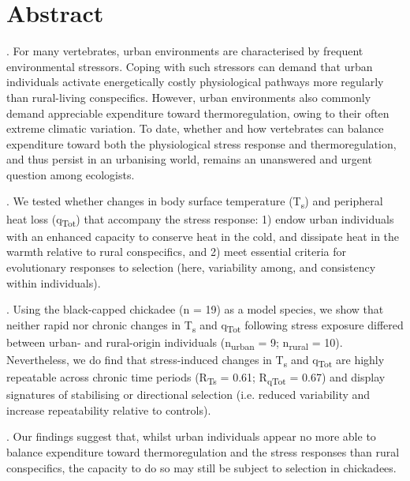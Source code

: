 \documentclass[12pt]{article}
\begin{document}
\linenumbers
\fontsize{12pt}{12pt}\selectfont

\section*{Abstract}

. For many vertebrates, urban environments are characterised by frequent environmental stressors. Coping with such stressors can demand that urban individuals activate energetically costly physiological pathways more regularly than rural-living conspecifics. However, urban environments also commonly demand appreciable expenditure toward thermoregulation, owing to their often extreme climatic variation. To date, whether and how vertebrates can balance expenditure toward both the physiological stress response and thermoregulation, and thus persist in an urbanising world, remains an unanswered and urgent question among ecologists. 
\vspace{\baselineskip}

. We tested whether changes in body surface temperature (T\textsubscript{s}) and peripheral heat loss (q\textsubscript{Tot}) that accompany the stress response: 1) endow urban individuals with an enhanced capacity to conserve heat in the cold, and dissipate heat in the warmth relative to rural conspecifics, and 2) meet essential criteria for evolutionary responses to selection (here, variability among, and consistency within individuals). 
\vspace{\baselineskip}

. Using the black-capped chickadee (n = 19) as a model species, we show that neither rapid nor chronic changes in T\textsubscript{s} and q\textsubscript{Tot} following stress exposure differed between urban- and rural-origin individuals (n\textsubscript{urban} = 9; n\textsubscript{rural} = 10). Nevertheless, we do find that stress-induced changes in T\textsubscript{s} and q\textsubscript{Tot} are highly repeatable across chronic time periods (R\textsubscript{Ts} = 0.61; R\textsubscript{qTot} = 0.67) and display signatures of stabilising or directional selection (i.e. reduced variability and increase repeatability relative to controls). 
\vspace{\baselineskip}

. Our findings suggest that, whilst urban individuals appear no more able to balance expenditure toward thermoregulation and the stress responses than rural conspecifics, the capacity to do so may still be subject to selection in chickadees.
\vspace{\baselineskip}
\vspace{\baselineskip}
\end{document}

